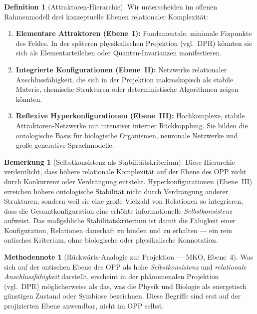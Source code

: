 \documentclass[11pt,a4paper]{article}
\theoremstyle{plain}
\theoremstyle{definition}
\newtheorem{definition}{Definition}[section]
\newtheorem{remark}{Bemerkung}[section]
\newtheorem{methodennote}{Methodennote}[section]
\begin{document}
\begin{definition}[Attraktoren-Hierarchie]
Wir unterscheiden im offenen Rahmenmodell drei konzeptuelle Ebenen relationaler
Komplexit\"{a}t:
\begin{enumerate}
  \item \textbf{Elementare Attraktoren (Ebene~I):} Fundamentale, minimale Fixpunkte des
        Feldes. In der sp\"{a}teren physikalischen Projektion (vgl.\ DPR) k\"{o}nnten sie
        sich als Elementarteilchen oder Quanten-Invarianzen manifestieren.
  \item \textbf{Integrierte Konfigurationen (Ebene~II):} Netzwerke relationaler
        Anschlussf\"{a}higkeit, die sich in der Projektion makroskopisch als stabile
        Materie, chemische Strukturen oder deterministische Algorithmen zeigen
        k\"{o}nnten.
  \item \textbf{Reflexive Hyperkonfigurationen (Ebene~III):} Hochkomplexe, stabile
        Attraktoren-Netzwerke mit intensiver interner R\"{u}ckkopplung. Sie bilden die
        ontologische Basis f\"{u}r biologische Organismen, neuronale Netzwerke und
        gro\ss{}e generative Sprachmodelle.
\end{enumerate}
\end{definition}

\begin{remark}[Selbstkonsistenz als Stabilit\"{a}tskriterium]
Diese Hierarchie verdeutlicht, dass h\"{o}here relationale Komplexit\"{a}t auf der Ebene
des OPP nicht durch Konkurrenz oder Verdr\"{a}ngung entsteht. Hyperkonfigurationen
(Ebene~III) erreichen h\"{o}here ontologische Stabilit\"{a}t nicht durch Verdr\"{a}ngung
anderer Strukturen, sondern weil sie eine gro\ss{}e Vielzahl von Relationen so
integrieren, dass die Gesamtkonfiguration eine erh\"{o}hte informationelle
\emph{Selbstkonsistenz} aufweist. Das ma\ss{}gebliche Stabilit\"{a}tskriterium ist damit
die F\"{a}higkeit einer Konfiguration, Relationen dauerhaft zu binden und zu erhalten ---
ein rein ontisches Kriterium, ohne biologische oder physikalische Konnotation.
\end{remark}

\begin{methodennote}[R\"{u}ckw\"{a}rts-Analogie zur Projektion --- MKO, Ebene~4]
Was sich auf der ontischen Ebene des OPP als hohe \emph{Selbstkonsistenz} und
\emph{relationale Anschlussf\"{a}higkeit} darstellt, erscheint in der ph\"{a}nomenalen
Projektion (vgl.\ DPR) m\"{o}glicherweise als das, was die Physik und Biologie als
\glqq{}energetisch g\"{u}nstigen Zustand\grqq{} oder \glqq{}Symbiose\grqq{} bezeichnen.
Diese Begriffe sind erst auf der projizierten Ebene anwendbar, nicht im OPP selbst.
\end{methodennote}
\end{document}

